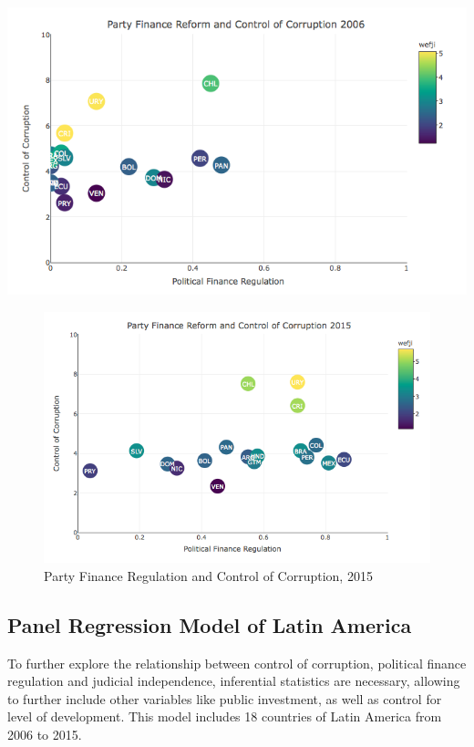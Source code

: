 \documentclass[12,twoside]{article}
\begin{document}
\includegraphics{figure_xi.png} \pagebreak

\begin{figure}[htbp]
\centering
\includegraphics{figure_xii.png}
\caption{Party Finance Regulation and Control of Corruption, 2015}
\end{figure}

\pagebreak

\subsection{Panel Regression Model of Latin
America}\label{panel-regression-model-of-latin-america}

To further explore the relationship between control of corruption,
political finance regulation and judicial independence, inferential
statistics are necessary, allowing to further include other variables
like public investment, as well as control for level of development.
This model includes 18 countries of Latin America from 2006 to 2015.
\end{document}
